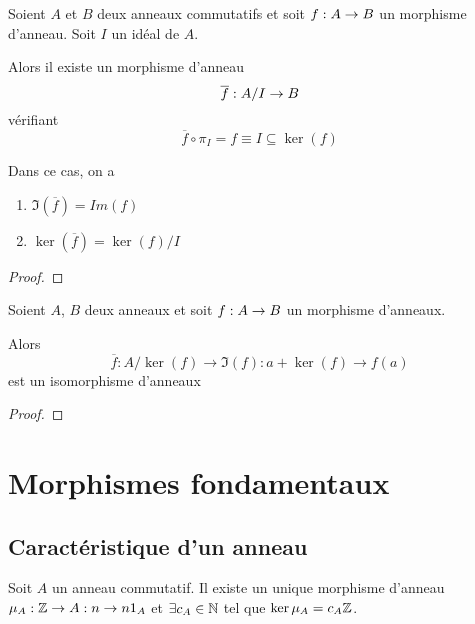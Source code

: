 \begin{proposition}
	Soient $A$ et $B$ deux anneaux commutatifs et soit $f : A \rightarrow B$ un
	morphisme d'anneau.
	Soit $I$ un idéal de $A$.

	Alors il existe un morphisme d'anneau
	\begin{equation}
		\overline{f} : A / I \rightarrow B
	\end{equation}
	vérifiant
	\begin{equation}
		\overline{f} \circ \pi_{I} = f \equiv I \subseteq \ker(f)
	\end{equation}

	Dans ce cas, on a
	\begin{enumerate}
		\item $\Im(\overline{f}) = Im(f)$
		\item $\ker(\overline{f}) = \ker(f) / I$
	\end{enumerate}
\end{proposition}

\ifdefined\outputproof
\begin{proof}

\end{proof}
\fi

\begin{corollary}
	Soient $A$, $B$ deux anneaux et soit $f : A \rightarrow B$ un morphisme
	d'anneaux.

	Alors
	\begin{equation}
		\overline{f} : A / \ker(f) \rightarrow \Im(f) : a + \ker(f) \rightarrow
		f(a)
	\end{equation}
	est un isomorphisme d'anneaux
\end{corollary}

\ifdefined\outputproof
\begin{proof}

\end{proof}
\fi

\section{Morphismes fondamentaux}

\subsection{Caractéristique d'un anneau}
\label{subsection:ring_caracteristic}

\begin{proposition}
	Soit $A$ un anneau commutatif. Il existe un unique morphisme d'anneau
	$\mu_{A} : \mathbb{Z} \rightarrow A : n \rightarrow n 1_{A}$ et $\exists c_{A} \in
	\mathbb{N}$ tel que $\ker{\mu_{A}} = c_{A} \mathbb{Z}$.
\end{proposition}

